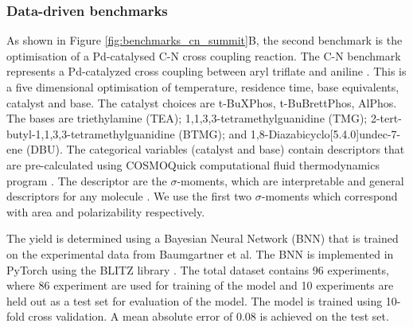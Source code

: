  
\subsubsection{Data-driven benchmarks}

As shown in Figure \ref{fig:benchmarks_cn_summit}B, the second benchmark is the optimisation of a Pd-catalysed C-N cross coupling reaction. The C-N benchmark represents a Pd-catalyzed cross coupling between aryl triflate and aniline \cite{Baumgartner2019}. This is a five dimensional optimisation of temperature, residence time, base equivalents, catalyst and base. The catalyst choices are t-BuXPhos, t-BuBrettPhos, AlPhos. The bases are triethylamine (TEA); 1,1,3,3-tetramethylguanidine (TMG); 2-tert-butyl-1,1,3,3-tetramethylguanidine (BTMG); and 1,8-Diazabicyclo[5.4.0]undec-7-ene (DBU). The categorical variables (catalyst and base) contain descriptors that are pre-calculated using COSMOQuick computational fluid thermodynamics program \cite{Loschen2012}. The descriptor are the $\sigma$-moments, which are interpretable and general descriptors for any molecule \cite{Zissimos2002}. We use the first two $\sigma$-moments which correspond with area and polarizability respectively.

The yield is determined using a Bayesian Neural Network (BNN) that is trained on the experimental data from Baumgartner et al.\cite{Baumgartner2019} The BNN is implemented in PyTorch \cite{Paszke2019} using the BLITZ library \cite{Esposito2020}. The total dataset contains 96 experiments, where 86 experiment are used for training of the model and 10 experiments are held out as a test set for evaluation of the model. The model is trained using 10-fold cross validation. A mean absolute error of 0.08 is achieved on the test set.


